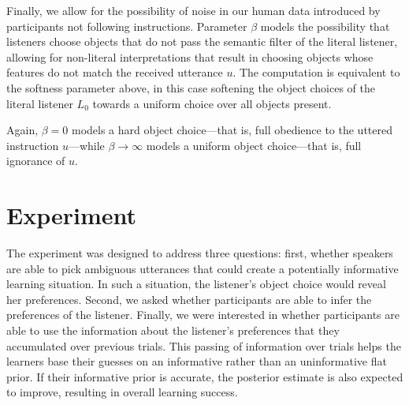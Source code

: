 \documentclass[10pt,a4paper]{article}
\begin{document}


Finally, we allow for the possibility of noise in our human data introduced by participants not following instructions.
Parameter $\beta$ models the possibility that listeners choose objects that do not pass the semantic filter of the literal listener, allowing for non-literal interpretations that result in choosing objects whose features do not match the received utterance $u$. 
The computation is equivalent to the softness parameter above, in this case softening the object choices of the literal listener $L_0$ towards a uniform choice over all objects present. 

Again, $\beta=0$ models a hard object choice---that is, full obedience to the uttered instruction $u$---while $\beta \rightarrow \infty$ models a uniform object choice---that is, full ignorance of $u$.

\section{Experiment}

The experiment was designed to address three questions: first, whether speakers are able to pick ambiguous utterances that could create a potentially informative learning situation. In such a situation, the listener's object choice would reveal her preferences. Second, we asked whether participants are able to infer the preferences of the listener. Finally, we were interested in whether participants are able to use the information about the listener's preferences that they accumulated over previous trials. This passing of information over trials helps the learners base their guesses on an informative rather than an uninformative flat prior. If their informative prior is accurate, the posterior estimate is also expected to improve, resulting in overall learning success.
\end{document}

